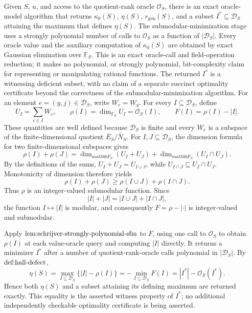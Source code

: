 Given \(S\), \(u\), and access to the quotient-rank oracle \(\mathcal O_S\), there is an exact oracle-model algorithm that returns \(\kappa_0(S)\), \(\eta(S)\), \(r_{\mathrm{gen}}(S)\), and a subset \(I^*\subseteq\mathcal D_S\) attaining the maximum that defines \(\eta(S)\).  The submodular-minimization stage uses a strongly polynomial number of calls to \(\mathcal O_S\) as a function of \(|\mathcal D_S|\).  Every oracle value and the auxiliary computation of \(\kappa_0(S)\) are obtained by exact Gaussian elimination over \(\mathbb F_S\).  This is an exact oracle-call and field-operation reduction; it makes no polynomial, or strongly polynomial, bit-complexity claim for representing or manipulating rational functions.  The returned \(I^*\) is a witnessing deficient subset, with no claim of a separate succinct optimality certificate beyond the correctness of the submodular-minimization algorithm.
For an element \(e=(y,j)\in\mathcal D_S\), write \(W_e=W_y\).  For every \(I\subseteq\mathcal D_S\), define
\[
 U_I=\sum_{e\in I}W_e,
 \qquad
 \rho(I)=\dim_{\mathbb F_S}U_I=\mathcal O_S(I),
 \qquad
 F(I)=\rho(I)-|I|.
\]
These quantities are well defined because \(\mathcal D_S\) is finite and every \(W_e\) is a subspace of the finite-dimensional quotient \(\overline E_S/\overline N_S\).  For \(I,J\subseteq\mathcal D_S\), the dimension formula for two finite-dimensional subspaces gives
\[
 \rho(I)+\rho(J)
 =\dim_{mathbb F_S}(U_I+U_J)
  +\dim_{mathbb F_S}(U_I\cap U_J).
\]
By the definitions of the sums, \(U_I+U_J=U_{I\cup J}\), while \(U_{I\cap J}\subseteq U_I\cap U_J\).  Monotonicity of dimension therefore yields
\[
 \rho(I)+\rho(J)
 \geq \rho(I\cup J)+\rho(I\cap J).
\]
Thus \(\rho\) is an integer-valued submodular function.  Since
\[
 |I|+|J|=|I\cup J|+|I\cap J|,
\]
the function \(I\mapsto |I|\) is modular, and consequently \(F=\rho-|\cdot|\) is integer-valued and submodular.

Apply \(\textnormal{lem:schrijver-strongly-polynomial-sfm}\) to \(F\), using one call to \(\mathcal O_S\) to obtain \(\rho(I)\) at each value-oracle query and computing \(|I|\) directly.  It returns a minimizer \(I^*\) after a number of quotient-rank-oracle calls polynomial in \(|\mathcal D_S|\).  By \(\textnormal{def:hall-defect}\),
\[
 \eta(S)
 =\max_{I\subseteq\mathcal D_S}\bigl\{|I|-\rho(I)\bigr\}
 =-\min_{I\subseteq\mathcal D_S}F(I)
 =|I^*|-\mathcal O_S(I^*).
\]
Hence both \(\eta(S)\) and a subset attaining its defining maximum are returned exactly.  This equality is the asserted witness property of \(I^*\); no additional independently checkable optimality certificate is being asserted.

